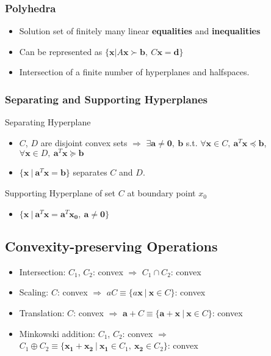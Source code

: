 \subsubsection*{Polyhedra}
\begin{itemize}
    \item Solution set of finitely many linear \textbf{equalities} and \textbf{inequalities}
    \item Can be represented as $\{\mathbf{x}|A\mathbf{x} \succ \mathbf{b},~ C\mathbf{x} = \mathbf{d} \}$
    \item Intersection of a finite number of hyperplanes and halfspaces.
\end{itemize}

\subsubsection*{Separating and Supporting Hyperplanes}

Separating Hyperplane
\begin{itemize}
    \item $C$, $D$ are disjoint convex sets $\Rightarrow$ 
        $\exists \mathbf{a} \neq \mathbf{0},~\mathbf{b}$ s.t. 
        $\forall \mathbf{x} \in C,~\mathbf{a}^T\mathbf{x} \preceq \mathbf{b}$,
        $\forall \mathbf{x} \in D,~\mathbf{a}^T\mathbf{x} \succeq \mathbf{b}$
    \item $\{\mathbf{x}~|~\mathbf{a}^T\mathbf{x} = \mathbf{b}\}$ separates $C$ and $D$.
\end{itemize}

Supporting Hyperplane of set $C$ at boundary point $x_0$
\begin{itemize}
    \item $\{\mathbf{x}~|~\mathbf{a}^T\mathbf{x} = \mathbf{a}^T\mathbf{x_0},~\mathbf{a}\neq\mathbf{0}\}$
\end{itemize}

\subsection{Convexity-preserving Operations}

\begin{itemize}
    \item Intersection: $C_1$, $C_2$: convex $\Rightarrow$ $C_1 \cap C_2$: convex
    \item Scaling: $C$: convex $\Rightarrow$ $aC \equiv \{a\mathbf{x}~|~\mathbf{x} \in C\}$: convex
    \item Translation: $C$: convex $\Rightarrow$ $\mathbf{a} + C \equiv \{\mathbf{a}+\mathbf{x}~|~\mathbf{x}\in C\}$: convex
    \item Minkowski addition: $C_1$, $C_2$: convex $\Rightarrow$ $C_1 \oplus C_2 \equiv \{\mathbf{x_1}+\mathbf{x_2}~|~\mathbf{x_1}\in C_1,~\mathbf{x_2}\in C_2\}$: convex
\end{itemize}
